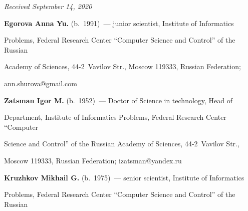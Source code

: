




\hfill{\small\textit{Received September 14, 2020}} 



















\Contr





\noindent


\textbf{Egorova Anna Yu.} (b.\ 1991)~--- junior scientist, Institute of Informatics 


Problems, Federal Research Center ``Computer Science and Control'' of the Russian 


Academy of Sciences, 44-2~Vavilov Str., Moscow 119333, Russian Federation; 


\mbox{ann.shurova@gmail.com}





\vspace*{3pt}





\noindent


\textbf{Zatsman Igor M.} (b.\ 1952)~--- Doctor of Science in technology, Head of 


Department, Institute of Informatics Problems, Federal Research Center ``Computer 


Science and Control'' of the Russian Academy of Sciences, 44-2~Vavilov Str., 


Moscow 119333, Russian Federation; \mbox{izatsman@yandex.ru}





\vspace*{3pt}


\noindent


\textbf{Kruzhkov Mikhail G.} (b.\ 1975)~--- senior scientist, Institute of Informatics 


Problems, Federal Research Center ``Computer Science and Control'' of the Russian 


